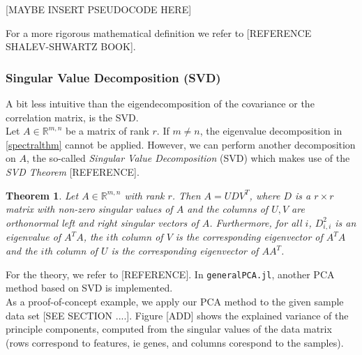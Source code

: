 \documentclass[journal, a4paper]{IEEEtran}
\newtheorem{theorem}{Theorem}[section]
\begin{document}
[MAYBE INSERT PSEUDOCODE HERE]

For a more rigorous mathematical definition we refer to [REFERENCE SHALEV-SHWARTZ BOOK].






\hfill 
\subsubsection{Singular Value Decomposition (SVD)}\label{svd}


A bit less intuitive than the eigendecomposition of the covariance or the correlation matrix, is the SVD.\\
Let \( A \in \mathbb{R}^{m,n} \) be a matrix of rank \( r \). If \( m \neq n\), the eigenvalue decomposition in \ref{spectralthm} cannot be applied. However, we can perform another decomposition on \( A \), the so-called \textit{Singular Value Decomposition} (SVD) which makes use of the \textit{SVD Theorem} [REFERENCE].
\begin{theorem}\label{svdthm}
	Let \( A \in \mathbb{R}^{m,n} \) with rank \( r \). Then \( A = UDV^T\), where \( D \) is a \( r \times r \) matrix with non-zero singular values of \( A \) and the columns of \( U, V \) are orthonormal left and right singular vectors of \( A \). Furthermore, for all \( i \), \( D_{i,i}^{2} \) is an eigenvalue of \( A^T A\), the \( i \)th column of \( V \) is the corresponding eigenvector of \( A^T A\) and the \( i \)th column of \( U \) is the corresponding eigenvector of \( A A^T\).
\end{theorem}

% 
For the theory, we refer to [REFERENCE]. In \texttt{generalPCA.jl}, another PCA method based on SVD is implemented.\\

As a proof-of-concept example, we apply our PCA method to the given sample data set [SEE SECTION ....].
Figure [ADD] shows the explained variance of the principle components, computed from the singular values of the data matrix (rows correspond to features, ie genes, and columns corespond to the samples). 
\end{document}
